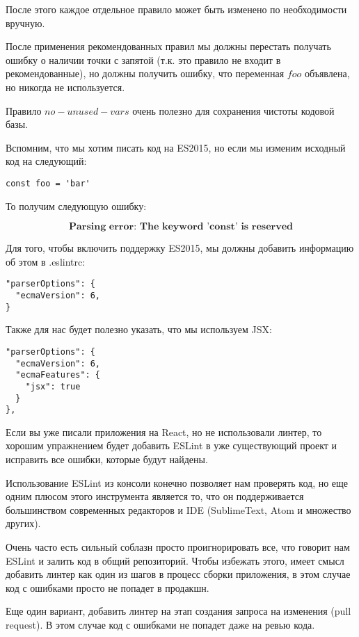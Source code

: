 После этого каждое отдельное правило может быть изменено по необходимости вручную.

После применения рекомендованных правил мы должны перестать получать ошибку о наличии точки с запятой (т.к. это правило не входит в рекомендованные), но должны получить ошибку, что переменная $foo$ объявлена, но никогда не используется.

Правило $no-unused-vars$ очень полезно для сохранения чистоты кодовой базы.

Вспомним, что мы хотим писать код на ES2015, но если мы изменим исходный код на следующий:

\begin{lstlisting}
const foo = 'bar'
\end{lstlisting}

То получим следующую ошибку:

$$
\textbf{Parsing error: The keyword 'const' is reserved}
$$

Для того, чтобы включить поддержку ES2015, мы должны добавить информацию об этом в .eslintrc:

\begin{lstlisting}
"parserOptions": {
  "ecmaVersion": 6,
}
\end{lstlisting}

Также для нас будет полезно указать, что мы используем JSX:

\begin{lstlisting}
"parserOptions": {
  "ecmaVersion": 6,
  "ecmaFeatures": {
    "jsx": true 
  }
},
\end{lstlisting}

Если вы уже писали приложения на React, но не использовали линтер, то хорошим упражнением будет добавить ESLint в уже существующий проект и исправить все ошибки, которые будут найдены.

Использование ESLint из консоли конечно позволяет нам проверять код, но еще одним плюсом этого инструмента является то, что он поддерживается большинством современных редакторов и IDE (SublimeText, Atom и множество других).

Очень часто есть сильный соблазн просто проигнорировать все, что говорит нам ESLint и залить код в общий репозиторий. Чтобы избежать этого, имеет смысл добавить линтер как один из шагов в процесс сборки приложения, в этом случае код с ошибками просто не попадет в продакшн.

Еще один вариант, добавить линтер на этап создания запроса на изменения (pull request). В этом случае код с ошибками не попадет даже на ревью кода.

